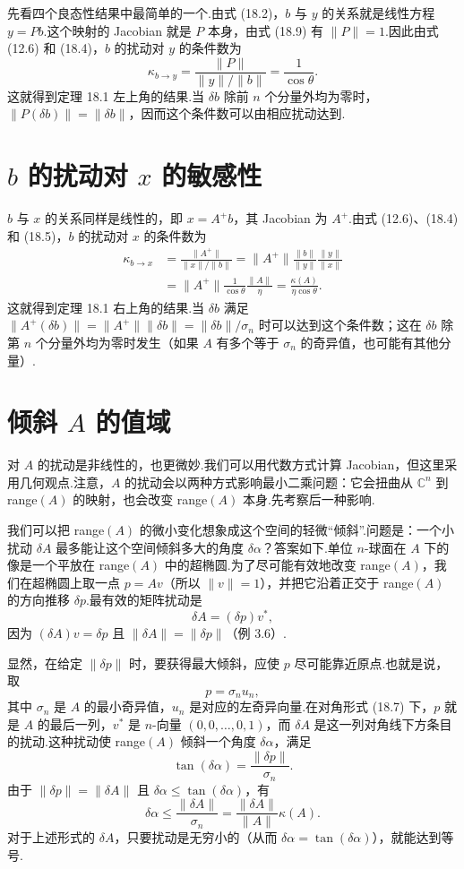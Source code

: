 \documentclass[UTF8,fontset=none,12pt]{ctexart}
\newcommand{\C}{\mathbb{C}}
\theoremstyle{definition}
\begin{document}
先看四个良态性结果中最简单的一个.由式 (18.2)，$b$ 与 $y$ 的关系就是线性方程 $y=Pb$.这个映射的 Jacobian 就是 $P$ 本身，由式 (18.9) 有 $\|P\|=1$.因此由式 (12.6) 和 (18.4)，$b$ 的扰动对 $y$ 的条件数为
\[
\kappa_{b\to y}
=\frac{\|P\|}{\|y\|/\|b\|}
=\frac{1}{\cos\theta}.
\]
这就得到定理 18.1 左上角的结果.当 $\delta b$ 除前 $n$ 个分量外均为零时，$\|P(\delta b)\|=\|\delta b\|$，因而这个条件数可以由相应扰动达到.

\section*{$b$ 的扰动对 $x$ 的敏感性}

$b$ 与 $x$ 的关系同样是线性的，即 $x=A^+b$，其 Jacobian 为 $A^+$.由式 (12.6)、(18.4) 和 (18.5)，$b$ 的扰动对 $x$ 的条件数为
\[
\begin{aligned}
\kappa_{b\to x}
&=\frac{\|A^+\|}{\|x\|/\|b\|}
=\|A^+\|\frac{\|b\|}{\|y\|}\frac{\|y\|}{\|x\|}\\
&=\|A^+\|\frac{1}{\cos\theta}\frac{\|A\|}{\eta}
=\frac{\kappa(A)}{\eta\cos\theta}.
\end{aligned}
\]
这就得到定理 18.1 右上角的结果.当 $\delta b$ 满足 $\|A^+(\delta b)\|=\|A^+\|\|\delta b\|=\|\delta b\|/\sigma_n$ 时可以达到这个条件数；这在 $\delta b$ 除第 $n$ 个分量外均为零时发生（如果 $A$ 有多个等于 $\sigma_n$ 的奇异值，也可能有其他分量）.

\section*{倾斜 $A$ 的值域}

对 $A$ 的扰动是非线性的，也更微妙.我们可以用代数方式计算 Jacobian，但这里采用几何观点.注意，$A$ 的扰动会以两种方式影响最小二乘问题：它会扭曲从 $\C^n$ 到 range$(A)$ 的映射，也会改变 range$(A)$ 本身.先考察后一种影响.

我们可以把 range$(A)$ 的微小变化想象成这个空间的轻微“倾斜”.问题是：一个小扰动 $\delta A$ 最多能让这个空间倾斜多大的角度 $\delta\alpha$？答案如下.单位 $n$-球面在 $A$ 下的像是一个平放在 range$(A)$ 中的超椭圆.为了尽可能有效地改变 range$(A)$，我们在超椭圆上取一点 $p=Av$（所以 $\|v\|=1$），并把它沿着正交于 range$(A)$ 的方向推移 $\delta p$.最有效的矩阵扰动是
\[
\delta A=(\delta p)v^*,
\]
因为 $(\delta A)v=\delta p$ 且 $\|\delta A\|=\|\delta p\|$（例 3.6）.

显然，在给定 $\|\delta p\|$ 时，要获得最大倾斜，应使 $p$ 尽可能靠近原点.也就是说，取
\[
p=\sigma_nu_n,
\]
其中 $\sigma_n$ 是 $A$ 的最小奇异值，$u_n$ 是对应的左奇异向量.在对角形式 (18.7) 下，$p$ 就是 $A$ 的最后一列，$v^*$ 是 $n$-向量 $(0,0,\ldots,0,1)$，而 $\delta A$ 是这一列对角线下方条目的扰动.这种扰动使 range$(A)$ 倾斜一个角度 $\delta\alpha$，满足
\[
\tan(\delta\alpha)=\frac{\|\delta p\|}{\sigma_n}.
\]
由于 $\|\delta p\|=\|\delta A\|$ 且 $\delta\alpha\le\tan(\delta\alpha)$，有
\begin{equation}
    \delta\alpha\le\frac{\|\delta A\|}{\sigma_n}
    =\frac{\|\delta A\|}{\|A\|}\kappa(A).
    \tag{18.10}
\end{equation}
对于上述形式的 $\delta A$，只要扰动是无穷小的（从而 $\delta\alpha=\tan(\delta\alpha)$），就能达到等号.
\end{document}
